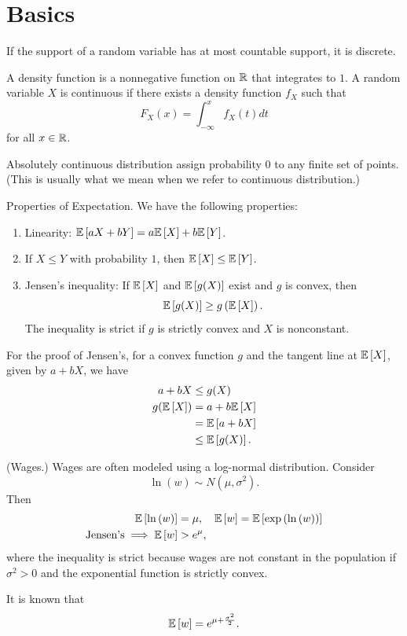 
\section{Basics}

If the support of a random variable has at most countable support, it is discrete.

A density function is a nonnegative function on $\mathbb{R}$ that integrates to $1$. A random variable $X$ is continuous if there exists a density function $f_X$ such that \[
	F_X(x) = \int_{-\infty}^{x} f_X(t) dt
\] for all $x \in \mathbb{R}$.

Absolutely continuous distribution assign probability $0$ to any finite set of points. (This is usually what we mean when we refer to continuous distribution.)

Properties of Expectation. We have the following properties:
\begin{enumerate}[label=(\roman*)]
	\item Linearity: $\mathbb{E}\left[aX + bY\right] = a\mathbb{E}\left[X\right]  + b\mathbb{E}\left[Y\right] $.
	\item If $X \le Y$ with probability $1$, then $\mathbb{E}\left[X\right]  \le \mathbb{E}\left[Y\right] $.
	\item Jensen's inequality: If $\mathbb{E}\left[X\right] $ and $\mathbb{E}\left[g(X)\right] $ exist and $g$ is convex, then \[
		      \mathbb{E}\left[g(X)\right] \ge g\left( \mathbb{E}\left[X\right]  \right)
		      .\] The inequality is strict if $g$ is strictly convex and $X$ is nonconstant.
\end{enumerate}

For the proof of Jensen's, for a convex function $g$ and the tangent line at $\mathbb{E}\left[X\right] $, given by $a  + bX$, we have
\begin{align*}
	a+bX                 & \le g(X)                \\
	g(\mathbb{E}\left[X\right] ) & = a + b\mathbb{E}\left[X\right] \\
	                     & = \mathbb{E}\left[a + bX\right] \\
	                     & \le \mathbb{E}\left[g(X)\right]
	.\end{align*}

\begin{example}	(Wages.) Wages are often modeled using a log-normal distribution. Consider \[
		\ln{\left(w\right)} \sim N(\mu,\sigma^2)
		.\]
	Then
	\begin{align*}
		\mathbb{E}\left[\ln{\left(w\right)}\right]        & = \mu, \quad \mathbb{E}\left[w\right] = \mathbb{E}\left[\operatorname{exp}\left(\ln{\left(w\right)}\right)\right] \\
		\text{Jensen's} \implies \mathbb{E}\left[w\right] & > e^{\mu}
		,\end{align*}
	where the inequality is strict because wages are not constant in the population if $\sigma^2 > 0$ and the exponential function is strictly convex.

	It is known that \[
		\mathbb{E}\left[w\right] = e^{\mu + \frac{\sigma^2}{2}}
		.\]

\end{example}

